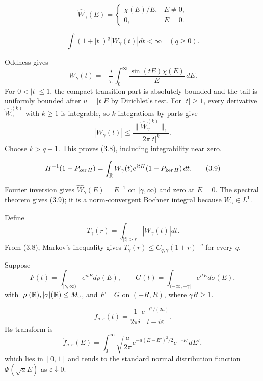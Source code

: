 \documentclass[11pt,a4paper]{article}
\begin{document}

\[
 \widehat W_\gamma(E)=\begin{cases}\chi(E)/E,&E\ne0,\\0,&E=0.\end{cases} \tag{3.7}
\]

\[
 \int(1+|t|)^q|W_\gamma(t)|dt<\infty\quad(q\geq0).                 \tag{3.8}
\]

\Because Oddness gives
\[
 W_\gamma(t)=-\frac{i}{\pi}\int_0^\infty\frac{\sin(tE)\chi(E)}E\,dE.
\]
For $0<|t|\leq1$, the compact transition part is absolutely bounded and the tail is
uniformly bounded after $u=|t|E$ by Dirichlet's test.  For $|t|\geq1$, every
derivative $\widehat W_\gamma^{(k)}$ with $k\geq1$ is integrable, so $k$
integrations by parts give
\[
 |W_\gamma(t)|\leq\frac{\|\widehat W_\gamma^{(k)}\|_1}{2\pi|t|^k}.
\]
Choose $k>q+1$.  This proves (3.8), including integrability near zero.

\[
 H^{-1}(1-P_{\ker H})=\int_\mathbb R W_\gamma(t)e^{itH}(1-P_{\ker H})\,dt. \tag{3.9}
\]

\Because Fourier inversion gives $\widehat W_\gamma(E)=E^{-1}$ on
$[\gamma,\infty)$ and zero at $E=0$.  The spectral theorem gives (3.9); it is a
norm-convergent Bochner integral because $W_\gamma\in L^1$.

Define
\[
 T_\gamma(r)=\int_{|t|>r}|W_\gamma(t)|dt.
\]
From (3.8), Markov's inequality gives
$T_\gamma(r)\leq C_{q,\gamma}(1+r)^{-q}$ for every $q$.

\QedStep


Suppose
\[
 F(t)=\int_{[\gamma,\infty)}e^{itE}d\rho(E),\qquad
 G(t)=\int_{(-\infty,-\gamma]}e^{itE}d\sigma(E),
\]
with $|\rho|(\mathbb R),|\sigma|(\mathbb R)\leq M_0$, and $F=G$ on $(-R,R)$, where
$\gamma R\geq1$.

\[
 f_{a,\varepsilon}(t)=\frac{1}{2\pi i}
 \frac{e^{-t^2/(2a)}}{t-i\varepsilon}.
\]
Its transform is
\[
 \check f_{a,\varepsilon}(E)=
 \int_0^\infty\sqrt{\frac a{2\pi}}
 e^{-a(E-E')^2/2}e^{-\varepsilon E'}dE',                           \tag{3.10}
\]
which lies in $[0,1]$ and tends to the standard normal distribution function
$\Phi(\sqrt aE)$ as $\varepsilon\downarrow0$.
\end{document}
